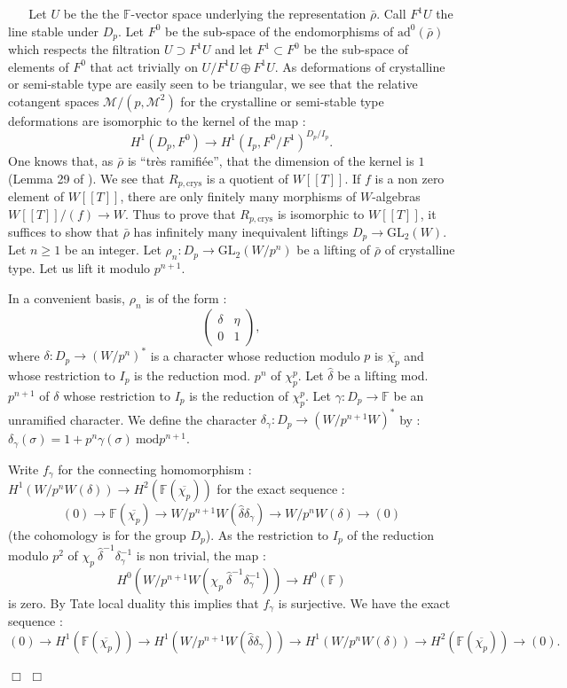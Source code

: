 \documentclass[12pt]{article}
\newenvironment{proof}{\smallskip\noindent{\bf Proof.}\
}{$\Box$\smallskip\goodbreak}
\def\rhob{ {\bar {\rho} } }
\newcommand{\F}{{\mathbb F}}
\begin{document}
\begin{proof}
\begin{proof}
Let $U$ be the the $\F$-vector space underlying the representation
$\rhob$. Call  $F^1 U$ the line stable under $D_p$.
Let $F^0 $ be the sub-space of the endomorphisms of
$ \mathrm{ad}^0 (\rhob )$  which respects the filtration $U\supset F^1 U$
and
let $F^1 \subset F^0$ be the sub-space of elements of $F^0$
that act trivially on $U/F^1 U\oplus F^1 U$. As deformations
of crystalline or semi-stable type are easily seen to be triangular,
we see that the relative cotangent spaces $\mathcal{M}/(p,\mathcal{M}^2)$
for the crystalline or semi-stable type deformations are isomorphic to
the kernel of the map :
$$H^1( D_p, F^0 )\rightarrow
H^1( I_p, F^0 / F^1 ) ^{D_p / I_p}.$$
One knows that, as $\rhob$ is ``tr\`es ramifi\'ee'', that the dimension
of the kernel is $1$ (Lemma 29 of \cite{[DDT]}).
We see that $R_{p,\mathrm{crys} }$ is a quotient of $W[[T]]$.
If $f$ is a non zero element of $W[[T]]$, there are only finitely many
morphisms of $W$-algebras $W[[T]]/(f) \rightarrow W$.
Thus to prove that $R_{p,\mathrm{crys} }$ is isomorphic to $W[[T]]$,
it suffices to show  that
$\rhob$ has infinitely many  inequivalent liftings $D_p \rightarrow
\mathrm{GL}_2 (W )$.
Let $n\geq 1$ be an integer.
Let $\rho _n : D_p \rightarrow \mathrm{GL}_2 (W/ p^n )$
be a lifting of $\rhob$ of crystalline type.
Let us lift it modulo $p^{n+1}$.

In a convenient basis,
$\rho _n$ is of the form :
$$\left( \begin{array}{cc}
    \delta & \eta  \\
    0 & 1
\end{array} \right),$$
where  $\delta : D_p \rightarrow (W/p^n )^* $ is a character
whose reduction modulo $p$ is $\overline{\chi _p}$ and
whose restriction to $I_p$ is the reduction mod. $ p^n$
of $\chi_p ^p$.
Let $\widehat{\delta}$ be a lifting mod. $p^{n+1}$ of
$\delta$ whose restriction to $I_p$ is the reduction
of  $\chi_p ^p$. Let $\gamma : D_p \rightarrow \F$
be an unramified character.  We define the character
$\delta _{\gamma} : D_p \rightarrow
(W/p^{n+1} W)^*$ by :
$\delta _{\gamma}(\sigma )=1+p^n \gamma (\sigma )\
\mathrm{mod} p^{n+1}$.

Write $f_{\gamma }$ for the connecting homomorphism :
$ H^1 (W/ p^n W (\delta ))\rightarrow H^2 (\F (\overline{\chi _p } ))$
for the exact sequence :
$$(0) \rightarrow \F (\overline{\chi _p } ) \rightarrow
W/ p^{n+1} W ( \widehat{\delta}
\delta _{\gamma})\rightarrow W/p^{n}W ( \delta)\rightarrow (0)$$
(the cohomology is for the group $D_p$).
As the restriction to $I_p$ of the reduction
modulo $p^2$ of $\chi _p \ \widehat{\delta}^{-1}
\delta _{\gamma}^{-1}$ is non trivial, the map :
$$ H^0 (W/ p^{n+1} W (\chi _p \ \widehat{\delta}^{-1}
\delta _{\gamma}^{-1}))\rightarrow H^{0} (\F )$$
is zero. By Tate local duality this implies that $f_{\gamma }$ is surjective. We have
the exact sequence :
$$ (0)\rightarrow H^1 (\F (\overline{\chi _p } ))\rightarrow
H^1 (W/ p^{n+1} W ( \widehat{\delta}
\delta _{\gamma}))
\rightarrow
H^1 (W/ p^{n} W ( \delta))\rightarrow H^2 (\F (\overline{\chi _p } ))
\rightarrow (0).$$


\end{proof}
\end{proof}
\end{document}
